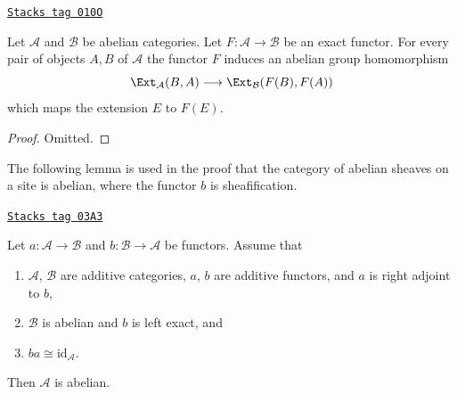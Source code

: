 \begin{lemma}
\label{homology-lemma-exact-functor-ext}
\href{https://stacks.math.columbia.edu/tag/010O}{\texttt{Stacks tag 010O}}

Let $\mathcal{A}$ and $\mathcal{B}$ be abelian categories.
Let $F : \mathcal{A} \to \mathcal{B}$ be an exact functor.
For every pair of objects $A, B$ of $\mathcal{A}$ the
functor $F$ induces an abelian group homomorphism
$$
\Ext_\mathcal{A}(B, A)
\longrightarrow
\Ext_\mathcal{B}(F(B), F(A))
$$
which maps the extension $E$ to $F(E)$.
\end{lemma}

\begin{proof}
Omitted.
\end{proof}

The following lemma is used in the proof that the category of abelian
sheaves on a site is abelian, where the functor $b$ is sheafification.

\begin{lemma}
\label{homology-lemma-adjoint-get-abelian}
\href{https://stacks.math.columbia.edu/tag/03A3}{\texttt{Stacks tag 03A3}}

Let $a : \mathcal{A} \to \mathcal{B}$ and $b : \mathcal{B} \to \mathcal{A}$
be functors. Assume that
\begin{enumerate}
\item $\mathcal{A}$, $\mathcal{B}$ are additive categories,
$a$, $b$ are additive functors, and $a$ is right adjoint to $b$,
\item $\mathcal{B}$ is abelian and $b$ is left exact, and
\item $ba \cong \text{id}_\mathcal{A}$.
\end{enumerate}
Then $\mathcal{A}$ is abelian.
\end{lemma}

